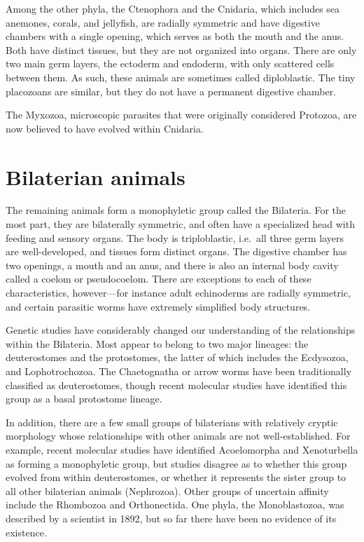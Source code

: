 \documentclass[]{book}
\theoremstyle{definition}
\theoremstyle{definition}
\theoremstyle{definition}
\theoremstyle{remark}
\begin{document}
Among the other phyla, the Ctenophora and the Cnidaria, which includes
sea anemones, corals, and jellyfish, are radially symmetric and have
digestive chambers with a single opening, which serves as both the mouth
and the anus. Both have distinct tissues, but they are not organized
into organs. There are only two main germ layers, the ectoderm and
endoderm, with only scattered cells between them. As such, these animals
are sometimes called diploblastic. The tiny placozoans are similar, but
they do not have a permanent digestive chamber.

The Myxozoa, microscopic parasites that were originally considered
Protozoa, are now believed to have evolved within Cnidaria.

\section{Bilaterian animals}\label{bilaterian-animals}

The remaining animals form a monophyletic group called the Bilateria.
For the most part, they are bilaterally symmetric, and often have a
specialized head with feeding and sensory organs. The body is
triploblastic, i.e.~all three germ layers are well-developed, and
tissues form distinct organs. The digestive chamber has two openings, a
mouth and an anus, and there is also an internal body cavity called a
coelom or pseudocoelom. There are exceptions to each of these
characteristics, however---for instance adult echinoderms are radially
symmetric, and certain parasitic worms have extremely simplified body
structures.

Genetic studies have considerably changed our understanding of the
relationships within the Bilateria. Most appear to belong to two major
lineages: the deuterostomes and the protostomes, the latter of which
includes the Ecdysozoa, and Lophotrochozoa. The Chaetognatha or arrow
worms have been traditionally classified as deuterostomes, though recent
molecular studies have identified this group as a basal protostome
lineage.

In addition, there are a few small groups of bilaterians with relatively
cryptic morphology whose relationships with other animals are not
well-established. For example, recent molecular studies have identified
Acoelomorpha and Xenoturbella as forming a monophyletic group, but
studies disagree as to whether this group evolved from within
deuterostomes, or whether it represents the sister group to all other
bilaterian animals (Nephrozoa). Other groups of uncertain affinity
include the Rhombozoa and Orthonectida. One phyla, the Monoblastozoa,
was described by a scientist in 1892, but so far there have been no
evidence of its existence.
\end{document}
